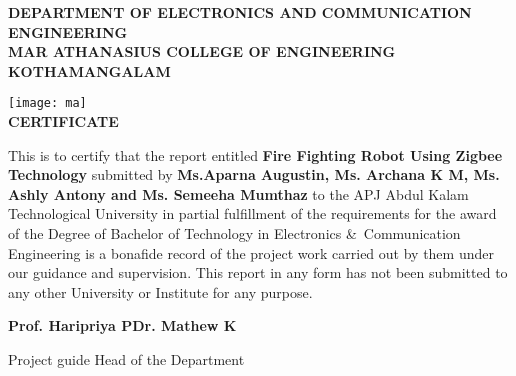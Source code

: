 \documentclass[12pt,a4paper]{report}
\date{}
\title{{\bf \Large FIRE FIGHTING ROBOT USING ZIGBEE TECHNOLOGY   }\\    
\vspace{0.2cm}
{\normalsize {A PROJECT REPORT}}\\
\vspace{0.2cm}
{\normalsize{ submitted by}}\\
\vspace{0.20 cm}
{\normalsize\textbf{APARNA AUGUSTIN}} \\
\normalsize {Reg. No :\textbf{ MAC15EC027}}\\
\vspace{0.20 cm}
{\normalsize\textbf{ARCHANA K M}} \\
\normalsize {Reg. No :\textbf{ MAC15EC031}}\\
\vspace{0.20 cm}
{\normalsize\textbf{ASHLY ANTONY}} \\
\normalsize {Reg. No :\textbf{ MAC15EC041}}\\
\vspace{0.20 cm}
\normalsize {\textbf{ SEMEEHA MUMTHAZ}}\\
\normalsize {Reg. No :\textbf{ MAC15EC110}}\\
\vspace{0.20 cm}
\normalsize{to}\\ 
\vspace{0.4cm}
\normalsize {the APJ Abdul Kalam Technological University}\\
\normalsize {in partial fulfillment of the requirements for the award of the Degree}\\
\vspace{0.4cm}
\normalsize {of}\\
\vspace{0.4cm}  
\normalsize {Bachelor of Technology}\\  
\normalsize {in} \\
\normalsize {\emph{ Electronics and Communication Engineering} }\\
\begin{figure}[H]
\centering
\texttt{[image: ma]}
\end{figure}
{\large \textbf {Department of Electronics and Communication Engineering}}\\
\vspace{0.4cm}
\normalsize {Mar Athanasius College of Engineering}\\
\normalsize {Kothamangalam, Kerala, India 686 666}\\
\vspace{0.4cm}
\author \large {MAY 2019}}
\begin{document}
\newpage
\maketitle
\begin{center}
{\large \bf{DEPARTMENT OF ELECTRONICS AND COMMUNICATION ENGINEERING}}\\
{\large \bf{MAR ATHANASIUS COLLEGE OF ENGINEERING}}\\
{\large \bf{KOTHAMANGALAM}}
\end{center}
\begin{center}
\thispagestyle{empty}
\texttt{[image: ma]}\\[7pt]
\large{\bf{CERTIFICATE}}
\end{center}
\onehalfspacing This is to certify that the report entitled {\large{ \textbf{Fire Fighting Robot Using Zigbee Technology }}} submitted by \textbf{Ms.Aparna Augustin, Ms. Archana K M, Ms. Ashly Antony and Ms. Semeeha Mumthaz} to the APJ Abdul Kalam Technological University in partial fulfillment of the requirements for the award of the Degree of Bachelor of Technology in  Electronics \&\ Communication Engineering is a bonafide record of the project work carried out by them under our guidance and supervision. This report in any form has not been submitted to any other University or Institute for any purpose.
\vspace{0.8in}
\begin{flushleft}
{\large{\textbf{Prof. Haripriya P}}}\hfill{\large {\textbf{Dr. Mathew K}}}
\end{flushleft}

\begin{flushleft}
Project guide                               \hfill{Head of the Department}
\end{flushleft}
 
\end{document}
